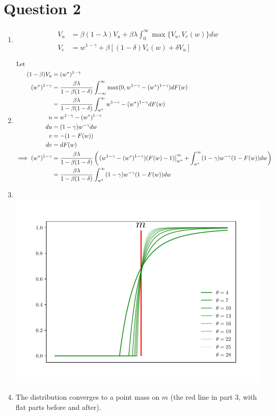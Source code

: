 \documentclass[11pt]{article}
\begin{document}
\newpage

\section{Question 2}
\label{sec:org791f9f5}

  \begin{enumerate}
\item
\begin{align*}
V_u &= \beta (1 - \lambda) V_u + \beta \lambda \int^\infty_0 \max \{V_u, V_e(w)\}dw \\
V_e &= w^{1 - \gamma} + \beta [(1 - \delta)V_e(w) + \delta V_u]
\end{align*}
\item 
\begin{align*}
\intertext{Let}
(1 - \beta)V_u &= (w^*)^{1 - \gamma}\\
(w^*)^{1 - \gamma} &= \frac{\beta \lambda}{1 - \beta (1 - \delta)} \int^\infty_{- \infty} \max(0, w^{1 - \gamma} - (w^*)^{1 - \gamma})dF(w)\\
&= \frac{\beta \lambda}{1 - \beta (1 - \delta)} \int^\infty_{w^*} w^{1 - \gamma} - (w^*)^{1 - \gamma} dF(w)\\
u &= w^{1 - \gamma} - (w^*)^{1 - \gamma}\\
du &= (1 - \gamma) w^{- \gamma} dw \\
v &= - (1 - F(w))\\
dv &= dF(w)\\
\implies (w^*)^{1 - \gamma} &= \frac{\beta \lambda}{1 - \beta (1 - \delta)} \left(\left.(w^{1 - \gamma} - (w^*)^{1 - \gamma})(F(w) - 1)\right|^\infty_{w^*} + \int^\infty_{w^*} (1 - \gamma) w^{- \gamma} (1 - F(w))dw\right)\\
&= \frac{\beta \lambda}{1 - \beta(1 - \delta)} \int^\infty_{w^*} (1 - \gamma)w^{- \gamma} (1 - F(w))dw
\end{align*}
\newpage
\item
$ $\\
\includegraphics{cdf_graph.pdf}
\item The distribution converges to a point mass on $m$ (the red line in part 3, with flat parts before and after).


\end{enumerate}
\end{document}
